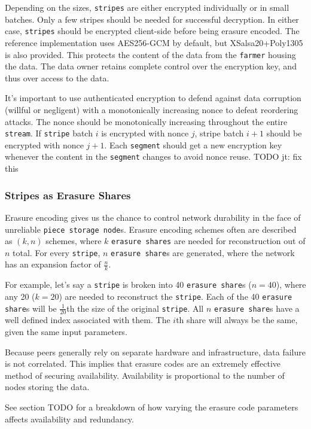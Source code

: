 \documentclass[a4paper,10pt]{article} \usepackage[utf8]{inputenc}
\newcommand{\x}[1]{{\tt #1}} \newcommand{\code}[1]{{\tt #1}}
\newcommand{\todo}[1]{{\color{red} TODO #1}}
\begin{document}
Depending on the sizes, \x{stripes} are either encrypted individually or in
small batches. Only a few stripes should be needed for successful
decryption. In either case, \x{stripes} should be encrypted client-side before
being erasure encoded. The reference implementation uses AES256-GCM by default,
but XSalsa20+Poly1305 is also provided. This protects the
content of the data from the \x{farmer} housing the data. The data owner
retains complete control over the encryption key, and thus over access to the
data.

It's important to use authenticated encryption to defend against data corruption
(willful or negligent) with a monotonically increasing nonce to defeat
reordering attacks. The nonce should be monotonically increasing throughout
the entire \x{stream}. If \x{stripe} batch $i$ is encrypted
with nonce $j$, stripe batch $i+1$ should be encrypted with nonce $j+1$. Each
\x{segment} should get a new encryption key whenever the content in the
\x{segment} changes to avoid nonce reuse. \todo{jt: fix this}

\subsubsection{Stripes as Erasure Shares}

Erasure encoding gives us the chance to control network durability in the face
of unreliable \x{piece storage node}s. Erasure encoding schemes often are
described as $(k, n)$ schemes, where $k$ \x{erasure shares} are needed for
reconstruction out of $n$ total. For every \x{stripe}, $n$ \x{erasure share}s
are generated, where the network has an expansion factor of $\frac{n}{k}$.

For example, let's say a \x{stripe} is broken into 40 \x{erasure share}s
($n=40$), where any 20 ($k=20$) are needed to reconstruct the \x{stripe}. Each
of the 40 \x{erasure share}s will be $\frac{1}{20}$th the size of the original
\x{stripe}. All $n$ \x{erasure share}s have a well defined index associated
with them. The $i$th share will always be the same, given the same input
parameters.

Because peers generally rely on separate hardware and infrastructure, data
failure is not correlated. This implies that erasure codes are an extremely
effective method of securing availability. Availability is proportional to the
number of nodes storing the data.

See section \todo{} for a breakdown of how varying the erasure code parameters
affects availability and redundancy.
\end{document}
